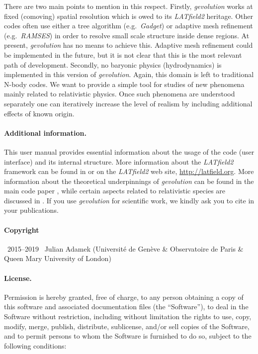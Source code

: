 \documentclass[a4paper,10pt]{article}
\begin{document}
There are two main points to mention in this respect. Firstly, \textit{gevolution} works at fixed (comoving) spatial resolution which is
owed to its \textit{LATfield2} heritage. Other codes often use either a tree algorithm (e.g.\ \textit{Gadget}) or adaptive mesh
refinement (e.g.\ \textit{RAMSES}) in order to resolve small scale structure inside dense regions. At present, \textit{gevolution} has no
means to achieve this. Adaptive mesh refinement could be implemented in the future, but it is not clear that this is the most relevant
path of development. Secondly, no baryonic physics (hydrodynamics) is implemented in this version of \textit{gevolution}. Again, this
domain is left to traditional N-body codes. We want to provide a simple tool for studies of new phenomena mainly related to relativistic 
physics. Once such phenomena are understood separately one can iteratively increase the level of realism by including additional effects of 
known origin.

\paragraph{Additional information.} This user manual provides essential information about the usage of the code (user interface) and its
internal structure. More information about the \textit{LATfield2} framework can be found in \cite{David:2015eya} or on the
\textit{LATfield2} web site, \url{http://latfield.org}. More information about the theoretical underpinnings of \textit{gevolution} can
be found in the main code paper \cite{Adamek:2016zes}, while certain aspects related to relativistic species are discussed in \cite{Adamek:2017grt,Adamek:2017uiq}.
If you use \textit{gevolution} for scientific work, we kindly ask you to cite
\cite{Adamek:2015eda} in your publications.

\paragraph{Copyright} \textcopyright~2015--2019~ Julian Adamek (Universit\'e de Gen\`eve \& Observatoire de Paris \& Queen Mary University of London)

\paragraph{License.} Permission is hereby granted, free of charge, to any person obtaining a copy
of this software and associated documentation files (the ``Software''), to deal
in the Software without restriction, including without limitation the rights
to use, copy, modify, merge, publish, distribute, sublicense, and/or sell
copies of the Software, and to permit persons to whom the Software is
furnished to do so, subject to the following conditions:
  
\end{document}

